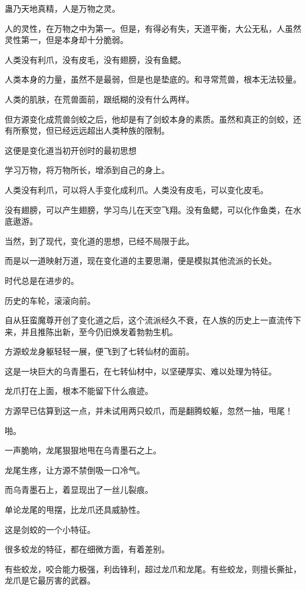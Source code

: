 
\begin{this_body}

蛊乃天地真精，人是万物之灵。

人的灵性，在万物之中为第一。但是，有得必有失，天道平衡，大公无私，人虽然灵性第一，但是本身却十分脆弱。

人类没有利爪，没有皮毛，没有翅膀，没有鱼鳃。

人类本身的力量，虽然不是最弱，但是也是垫底的。和寻常荒兽，根本无法较量。

人类的肌肤，在荒兽面前，跟纸糊的没有什么两样。

但方源变化成荒兽剑蛟之后，他却是有了剑蛟本身的素质。虽然和真正的剑蛟，还有所察觉，但已经远远超出人类种族的限制。

这便是变化道当初开创时的最初思想

学习万物，将万物所长，增添到自己的身上。

人类没有利爪，可以将人手变化成利爪。人类没有皮毛，可以变化皮毛。

没有翅膀，可以产生翅膀，学习鸟儿在天空飞翔。没有鱼鳃，可以化作鱼类，在水底遨游。

当然，到了现代，变化道的思想，已经不局限于此。

而是以一道映射万道，现在变化道的主要思潮，便是模拟其他流派的长处。

时代总是在进步的。

历史的车轮，滚滚向前。

自从狂蛮魔尊开创了变化道之后，这个流派经久不衰，在人族的历史上一直流传下来，并且推陈出新，至今仍旧焕发着勃勃生机。

方源蛟龙身躯轻轻一展，便飞到了七转仙材的面前。

这是一块巨大的乌青墨石，在七转仙材中，以坚硬厚实、难以处理为特征。

龙爪打在上面，根本不能留下什么痕迹。

方源早已估算到这一点，并未试用两只蛟爪，而是翻腾蛟躯，忽然一抽，甩尾！

啪。

一声脆响，龙尾狠狠地甩在乌青墨石之上。

龙尾生疼，让方源不禁倒吸一口冷气。

而乌青墨石上，着显现出了一丝儿裂痕。

单论龙尾的甩摆，比龙爪还具威胁性。

这是剑蛟的一个小特征。

很多蛟龙的特征，都在细微方面，有着差别。

有些蛟龙，咬合能力极强，利齿锋利，超过龙爪和龙尾。有些蛟龙，则擅长撕扯，龙爪是它最厉害的武器。


\end{this_body}

